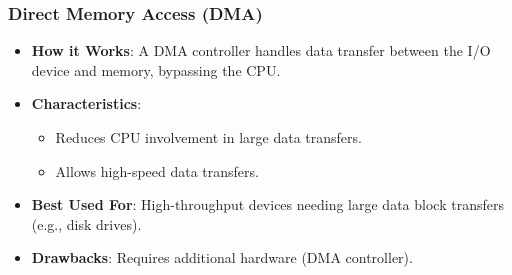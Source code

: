 \begin{frame}
    \frametitle{Direct Memory Access (DMA)}
    \begin{itemize}
        \item \textbf{How it Works}: A DMA controller handles data transfer between the I/O device and memory, bypassing the CPU.
        \item \textbf{Characteristics}:
            \begin{itemize}
                \item Reduces CPU involvement in large data transfers.
                \item Allows high-speed data transfers.
            \end{itemize}
        \item \textbf{Best Used For}: High-throughput devices needing large data block transfers (e.g., disk drives).
        \item \textbf{Drawbacks}: Requires additional hardware (DMA controller).
    \end{itemize}
\end{frame}

